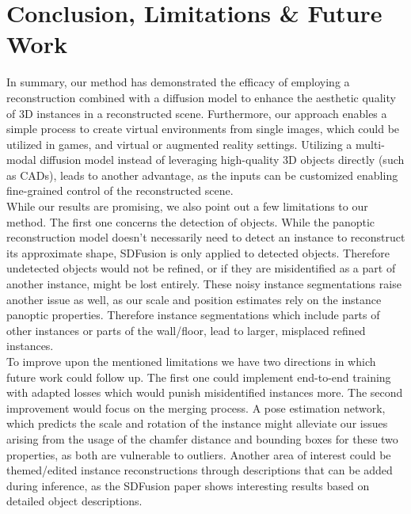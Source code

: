 \section{Conclusion, Limitations \& Future Work}
\label{sec:limitations}
In summary, our method has demonstrated the efficacy of employing a reconstruction combined with a diffusion model to enhance the aesthetic quality of 3D instances in a reconstructed scene. Furthermore, our approach enables a simple process to create virtual environments from single images, which could be utilized in games, and virtual or augmented reality settings. Utilizing a multi-modal diffusion model instead of leveraging high-quality 3D objects directly (such as CADs), leads to another advantage, as the inputs can be customized enabling fine-grained control of the reconstructed scene. 
\\

While our results are promising, we also point out a few limitations to our method. The first one concerns the detection of objects. While the panoptic reconstruction model doesn't necessarily need to detect an instance to reconstruct its approximate shape, SDFusion is only applied to detected objects. Therefore undetected objects would not be refined, or if they are misidentified as a part of another instance, might be lost entirely. These noisy instance segmentations raise another issue as well, as our scale and position estimates rely on the instance panoptic properties. Therefore instance segmentations which include parts of other instances or parts of the wall/floor, lead to larger, misplaced refined instances. 
\\

To improve upon the mentioned limitations we have two directions in which future work could follow up. The first one could implement end-to-end training with adapted losses which would punish misidentified instances more. The second improvement would focus on the merging process. A pose estimation network, which predicts the scale and rotation of the instance might alleviate our issues arising from the usage of the chamfer distance and bounding boxes for these two properties, as both are vulnerable to outliers. Another area of interest could be themed/edited instance reconstructions through descriptions that can be added during inference, as the SDFusion paper shows interesting results based on detailed object descriptions.

